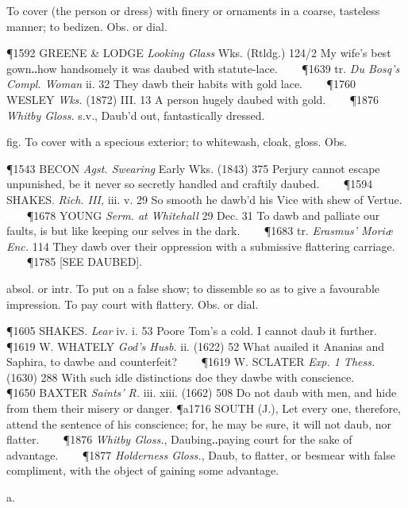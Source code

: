 \begin{description}[wide, labelwidth=!, labelindent=0pt]
\begin{myenumerate}
 To cover (the person or dress) with finery or ornaments in a coarse, tasteless manner; to bedizen. Obs. or dial.

\P 1592 GREENE \& LODGE  \textit{Looking Glass} Wks. (Rtldg.) 124/2 My wife's best gown‥how handsomely it was daubed with statute-lace.    
\P 1639 tr.  \textit{Du Bosq's Compl. Woman} ii. 32 They dawb their habits with gold lace.    
\P 1760 WESLEY  \textit{Wks.} (1872) III. 13 A person hugely daubed with gold.    
\P 1876  \textit{Whitby Gloss.} s.v., Daub'd out, fantastically dressed.

 fig. To cover with a specious exterior; to whitewash, cloak, gloss. Obs.

\P 1543 BECON  \textit{Agst. Swearing} Early Wks. (1843) 375 Perjury cannot escape unpunished, be it never so secretly handled and craftily daubed.    
\P 1594 SHAKES.  \textit{Rich. III,} iii. v. 29 So smooth he dawb'd his Vice with shew of Vertue.    
\P 1678 YOUNG  \textit{Serm. at Whitehall} 29 Dec. 31 To dawb and palliate our faults, is but like keeping our selves in the dark.    
\P 1683 tr.  \textit{Erasmus' Moriæ Enc.} 114 They dawb over their oppression with a submissive flattering carriage.    
\P 1785 [SEE DAUBED].

 absol. or intr. To put on a false show; to dissemble so as to give a favourable impression.  To pay court with flattery. Obs. or dial.

\P 1605 SHAKES.  \textit{Lear} iv. i. 53 Poore Tom's a cold. I cannot daub it further.    
\P 1619 W. WHATELY  \textit{God's Husb.} ii. (1622) 52 What auailed it Ananias and Saphira, to dawbe and counterfeit?    
\P 1619 W. SCLATER  \textit{Exp. 1 Thess.} (1630) 288 With such idle distinctions doe they dawbe with conscience.    
\P 1650 BAXTER  \textit{Saints' R.} iii. xiii. (1662) 508 Do not daub with men, and hide from them their misery or danger.
\P a1716 SOUTH  (J.), Let every one, therefore, attend the sentence of his conscience; for, he may be sure, it will not daub, nor flatter.    
\P 1876 \textit{Whitby  Gloss.}, Daubing‥paying court for the sake of advantage.    
\P 1877 \textit{Holderness Gloss.}, Daub, to flatter, or besmear with false compliment, with the object of gaining some advantage.
\end{myenumerate}


 a.

\noindent {}

\vspace{-0.3cm}


\end{description}

